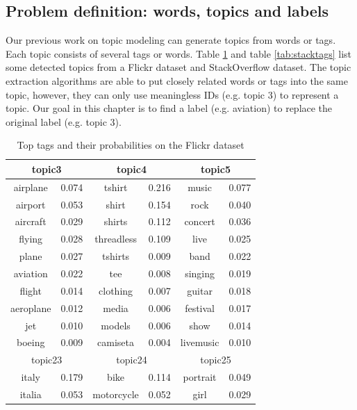\subsection{Problem definition: words, topics and labels}
Our previous work on topic modeling can generate topics from words or tags. Each topic consists of several tags or words. Table \ref{tab:flickrtags} and table \ref{tab:stacktags} list some detected topics from a Flickr dataset and StackOverflow dataset. The topic extraction algorithms are able to put closely related words or tags into the same topic, however, they can only use meaningless IDs (e.g. topic 3) to represent a topic. Our goal in this chapter is to find a label (e.g. aviation) to replace the original label (e.g. topic 3).



\begin{table}[htp]
\caption{Top tags and their probabilities on the Flickr dataset}
\label{tab:flickrtags}
\centering
\begin{tabular}{|c|c|c|c|c|c|}
\hline
\multicolumn{2}{|c|}{topic3} & \multicolumn{2}{c|}{topic4} & \multicolumn{2}{c|}{topic5}  \\
\hline
airplane&0.074&tshirt&0.216&music&0.077\\ \hline
airport&0.053&shirt&0.154&rock&0.040\\ \hline
aircraft&0.029&shirts&0.112&concert&0.036\\ \hline
flying&0.028&threadless&0.109&live&0.025\\ \hline
plane&0.027&tshirts&0.009&band&0.022\\ \hline
aviation&0.022&tee&0.008&singing&0.019\\ \hline
flight&0.014&clothing&0.007&guitar&0.018\\ \hline
aeroplane&0.012&media&0.006&festival&0.017\\ \hline
jet&0.010&models&0.006&show&0.014\\ \hline
boeing&0.009&camiseta&0.004&livemusic&0.010\\ \hline
\hline
\multicolumn{2}{|c|}{topic23} & \multicolumn{2}{c|}{topic24} & \multicolumn{2}{c|}{topic25}  \\
\hline
italy&0.179&bike&0.114&portrait&0.049\\ \hline
italia&0.053&motorcycle&0.052&girl&0.029\\ \hline

\end{tabular}
\end{table}
